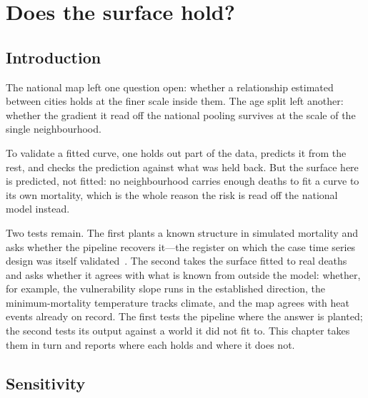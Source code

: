 \chapter{Does the surface hold?}\label{chapter:validation}

\section{Introduction}

The national map left one question open: whether a relationship estimated
between cities holds at the finer scale inside them. The age split left
another: whether the gradient it read off the national pooling survives at
the scale of the single neighbourhood. 

To validate a fitted curve, one holds out part of the data, predicts it from
the rest, and checks the prediction against what was held back. But the
surface here is predicted, not fitted: no neighbourhood carries enough deaths
to fit a curve to its own mortality, which is the whole reason the risk is
read off the national model instead.

Two tests remain. The first plants a known structure in simulated mortality
and asks whether the pipeline recovers it---the register on which the case
time series design was itself validated~\citep{gasparrini2021}. The second
takes the surface fitted to real deaths and asks whether it agrees with what
is known from outside the model: whether, for example, the vulnerability
slope runs in the established direction, the minimum-mortality temperature
tracks climate, and the map agrees with heat events already on record. The
first tests the pipeline where the answer is planted; the second tests its
output against a world it did not fit to. This chapter takes them in turn 
and reports where each holds and where it does not.

\section{Sensitivity}

